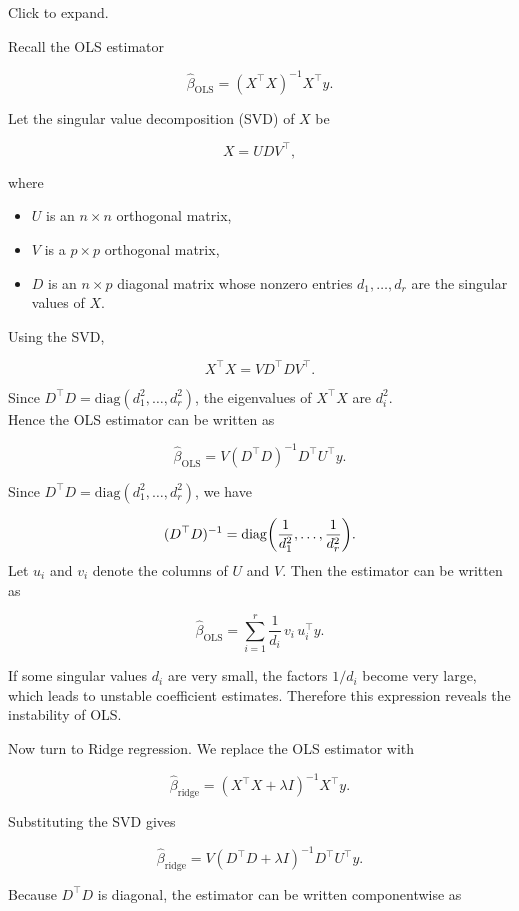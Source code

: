 \documentclass[
  letterpaper,
  DIV=11,
  numbers=noendperiod]{scrreprt}
\providecommand{\tightlist}{%
  \setlength{\itemsep}{0pt}\setlength{\parskip}{0pt}}
\newcommand{\ols}{\mathrm{OLS}}
\theoremstyle{definition}
\theoremstyle{definition}
\theoremstyle{plain}
\theoremstyle{plain}
\theoremstyle{remark}
\begin{document}
Click to expand.

Recall the OLS estimator

\[
\hat{\beta}_{\ols} = (X^\top X)^{-1}X^\top y .
\]

Let the singular value decomposition (SVD) of \(X\) be

\[
X = UDV^\top ,
\]

where

\begin{itemize}
\tightlist
\item
  \(U\) is an \(n \times n\) orthogonal matrix,
\item
  \(V\) is a \(p \times p\) orthogonal matrix,
\item
  \(D\) is an \(n \times p\) diagonal matrix whose nonzero entries
  \(d_1,\ldots,d_r\) are the singular values of \(X\).
\end{itemize}

Using the SVD,

\[
X^\top X = V D^\top D V^\top .
\]

Since \(D^\top D = \mathrm{diag}(d_1^2,\ldots,d_r^2)\), the eigenvalues
of \(X^\top X\) are \(d_i^2\).\\
Hence the OLS estimator can be written as

\[
\hat{\beta}_{\ols}
=
V(D^\top D)^{-1}D^\top U^\top y .
\]

Since \(D^\top D=\mathrm{diag}(d_1^2,\ldots,d_r^2)\), we have

\[
(D^\top D)^{-1}=\mathrm{diag}\qty(\frac{1}{d_1^2},\ldots,\frac{1}{d_r^2}).
\] Let \(u_i\) and \(v_i\) denote the columns of \(U\) and \(V\). Then
the estimator can be written as

\[
\hat{\beta}_{\ols}
=
\sum_{i=1}^{r}
\frac{1}{d_i}\, v_i\, u_i^\top y .
\]

If some singular values \(d_i\) are very small, the factors \(1/d_i\)
become very large, which leads to unstable coefficient estimates.
Therefore this expression reveals the instability of OLS.

Now turn to Ridge regression. We replace the OLS estimator with

\[
\hat{\beta}_{\text{ridge}}
=
(X^\top X+\lambda I)^{-1}X^\top y .
\]

Substituting the SVD gives

\[
\hat{\beta}_{\text{ridge}}
=
V(D^\top D+\lambda I)^{-1}D^\top U^\top y .
\]

Because \(D^\top D\) is diagonal, the estimator can be written
componentwise as
\end{document}
